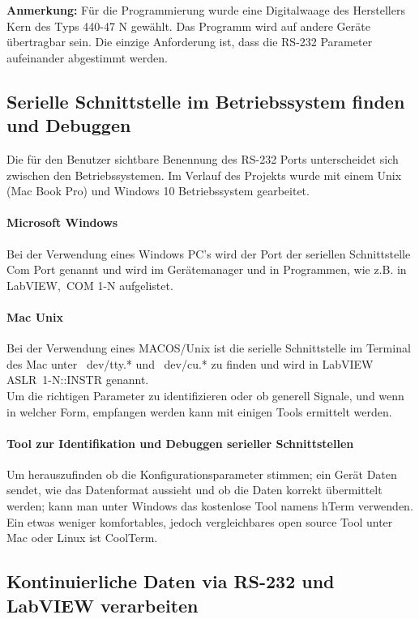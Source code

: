 \textbf{Anmerkung:} Für die Programmierung wurde eine Digitalwaage des Herstellers Kern des Typs 440-47 N gewählt. Das Programm wird auf andere Geräte übertragbar sein. Die einzige Anforderung ist, dass die RS-232 Parameter aufeinander abgestimmt werden.

\subsection{Serielle Schnittstelle im Betriebssystem finden und Debuggen} 

Die für den Benutzer sichtbare Benennung des RS-232 Ports unterscheidet sich zwischen den Betriebssystemen. Im Verlauf des Projekts wurde mit einem Unix (Mac Book Pro) und Windows 10 Betriebssystem gearbeitet. 

\paragraph*{Microsoft Windows} Bei der Verwendung eines Windows PC's wird der Port der seriellen Schnittstelle Com Port genannt und wird im Gerätemanager und in Programmen, wie z.B. in LabVIEW, \,{\Menlo COM 1-N} aufgelistet. 

\paragraph*{Mac Unix} Bei der Verwendung eines MACOS/Unix ist die serielle Schnittstelle im Terminal des Mac unter ~dev/tty.* und ~dev/cu.* zu finden und wird in LabVIEW \mbox{\,{\Menlo ASLR 1-N::INSTR}} genannt. \\

\noindent Um die richtigen Parameter zu identifizieren oder ob generell Signale, und wenn in welcher Form, empfangen werden kann mit einigen Tools ermittelt werden.

\paragraph{Tool zur Identifikation und Debuggen serieller Schnittstellen} Um herauszufinden ob die Konfigurationsparameter stimmen; ein Gerät Daten sendet, wie das Datenformat aussieht und ob die Daten korrekt übermittelt werden; kann man unter Windows das kostenlose Tool namens hTerm verwenden. Ein etwas weniger komfortables, jedoch vergleichbares open source Tool unter Mac oder Linux ist CoolTerm.\\

\subsection{Kontinuierliche Daten via RS-232 und LabVIEW verarbeiten}

